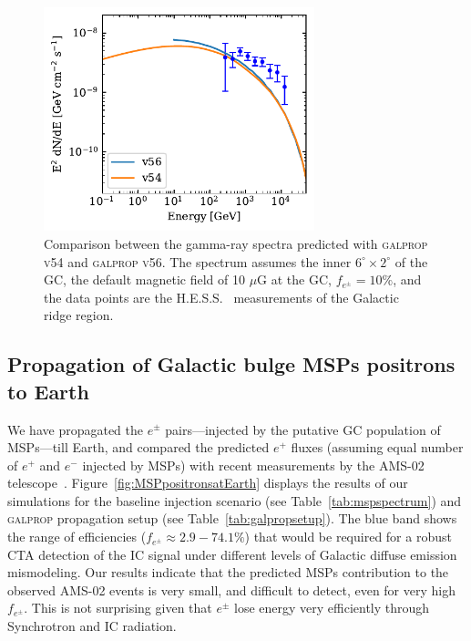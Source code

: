 \documentclass[doublespace,nopageskip]{VTthesis} %
\begin{document}
\begin{figure}[htb]
    \begin{center}
    \includegraphics[width=0.7\textwidth]{Figures/CTA/compare.pdf}
    \caption{Comparison between the gamma-ray spectra predicted with \textsc{galprop v54} and \textsc{galprop v56}. The spectrum assumes the inner $6^\circ \times 2^\circ$ of the GC, the default magnetic field of 10 $\mu$G at the GC, $f_{e^\pm}=10\%$, and the data points are the H.E.S.S.~\citep{2006Natur.439..695A} measurements of the Galactic ridge region.   }\label{fig:compareV54andV56}
    \end{center}
\end{figure}
 
\subsection{Propagation of Galactic bulge MSPs positrons to Earth}
 
We have propagated the $e^\pm$ pairs---injected by the putative GC population of MSPs---till Earth, and compared the predicted $e^+$ fluxes (assuming equal number of $e^+$ and $e^-$ injected by MSPs) with recent measurements by the AMS-02 telescope~\citep{2021PhR...894....1A}. Figure~\ref{fig:MSPpositronsatEarth} displays the results of our simulations for the baseline injection scenario (see Table~\ref{tab:mspspectrum}) and \textsc{galprop} propagation setup (see Table~\ref{tab:galpropsetup}). The blue band shows the range of efficiencies ($f_{e^\pm}\approx 2.9-74.1\%$) that would be required for a robust CTA detection of the IC signal under different levels of Galactic diffuse emission mismodeling. Our results indicate that the predicted MSPs contribution to the observed AMS-02 events is very small, and difficult to detect, even for very high $f_{e^\pm}$. This is not surprising given that $e^\pm$ lose energy very efficiently through Synchrotron and IC radiation.
\end{document}
